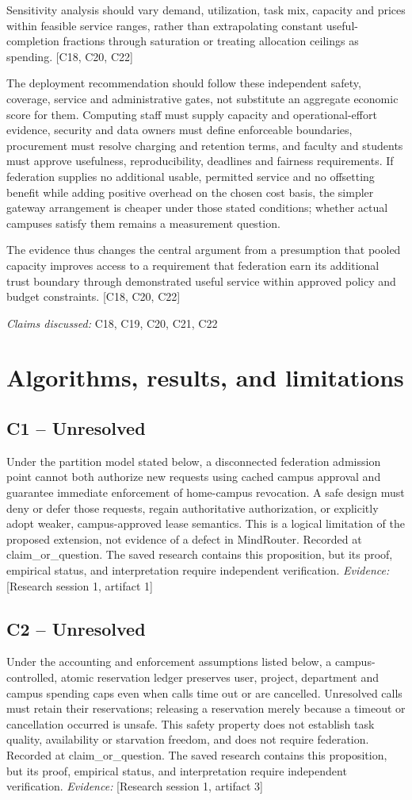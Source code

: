 \documentclass[11pt]{article}
\begin{document}
Sensitivity analysis should vary demand, utilization, task mix, capacity and prices within feasible service ranges, rather than extrapolating constant useful-completion fractions through saturation or treating allocation ceilings as spending. [C18, C20, C22]

The deployment recommendation should follow these independent safety, coverage, service and administrative gates, not substitute an aggregate economic score for them. Computing staff must supply capacity and operational-effort evidence, security and data owners must define enforceable boundaries, procurement must resolve charging and retention terms, and faculty and students must approve usefulness, reproducibility, deadlines and fairness requirements. If federation supplies no additional usable, permitted service and no offsetting benefit while adding positive overhead on the chosen cost basis, the simpler gateway arrangement is cheaper under those stated conditions; whether actual campuses satisfy them remains a measurement question.

The evidence thus changes the central argument from a presumption that pooled capacity improves access to a requirement that federation earn its additional trust boundary through demonstrated useful service within approved policy and budget constraints. [C18, C20, C22]

\textit{Claims discussed: }C18, C19, C20, C21, C22
\section{Algorithms, results, and limitations}
\subsection{C1 -- Unresolved}
Under the partition model stated below, a disconnected federation admission point cannot both authorize new requests using cached campus approval and guarantee immediate enforcement of home-campus revocation. A safe design must deny or defer those requests, regain authoritative authorization, or explicitly adopt weaker, campus-approved lease semantics. This is a logical limitation of the proposed extension, not evidence of a defect in MindRouter.
Recorded at claim\_or\_question. The saved research contains this proposition, but its proof, empirical status, and interpretation require independent verification.
\textit{Evidence: }[Research session 1, artifact 1]
\subsection{C2 -- Unresolved}
Under the accounting and enforcement assumptions listed below, a campus-controlled, atomic reservation ledger preserves user, project, department and campus spending caps even when calls time out or are cancelled. Unresolved calls must retain their reservations; releasing a reservation merely because a timeout or cancellation occurred is unsafe. This safety property does not establish task quality, availability or starvation freedom, and does not require federation.
Recorded at claim\_or\_question. The saved research contains this proposition, but its proof, empirical status, and interpretation require independent verification.
\textit{Evidence: }[Research session 1, artifact 3]
\end{document}

